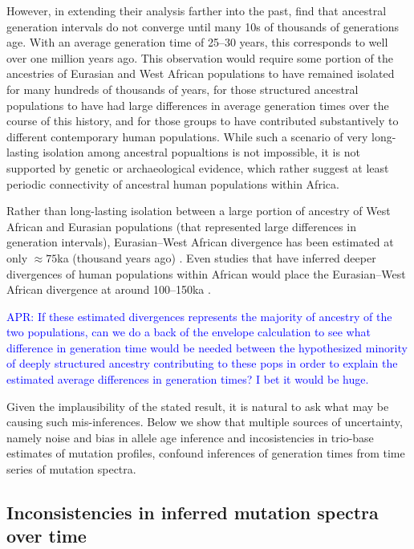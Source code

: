 \documentclass[]{article}
\newcommand{\aprcomment}[1]{{\textcolor{blue}{APR: #1}}}
\begin{document}
However, in extending their analysis farther into the past,
\citeauthor{wang2023human} find that ancestral generation intervals do not
converge until many 10s of thousands of generations age. With an average
generation time of 25--30 years, this corresponds to well over one million
years ago. This observation would require some portion of the ancestries of
Eurasian and West African populations to have remained isolated for many
hundreds of thousands of years, for those structured ancestral populations to
have had large differences in average generation times over the course of this
history, and for those groups to have contributed substantively to different
contemporary human populations. While such a scenario of very long-lasting
isolation among ancestral popualtions is not impossible, it is not supported by
genetic \citep{ragsdale2022weakly,others} or archaeological
\citep{scerri2018did,others} evidence, which rather suggest at least periodic
connectivity of ancestral human populations within Africa.

Rather than long-lasting isolation between a large portion of ancestry of West
African and Eurasian populations (that represented large differences in
generation intervals), Eurasian--West African divergence has been estimated at
only $\approx 75$ka (thousand years ago)
\citep[e.g.,][]{pagani2015tracing,other}. Even studies that have inferred
deeper divergences of human populations within African would place the
Eurasian--West African divergence at around 100--150ka
\citep{schlebusch2017southern}. 

\aprcomment{
    If these estimated divergences represents the majority of ancestry of the
    two populations, can we do a back of the envelope calculation to see what
    difference in generation time would be needed between the hypothesized
    minority of deeply structured ancestry contributing to these pops in order
    to explain the estimated average differences in generation times? I bet it
    would be huge.
}

Given the implausibility of the stated result, it is natural to ask what may be
causing such mis-inferences. Below we show that multiple sources of uncertainty,
namely noise and bias in allele age inference and incosistencies in trio-base
estimates of mutation profiles, confound inferences of generation times from
time series of mutation spectra.

\subsection*{Inconsistencies in inferred mutation spectra over time}
\end{document}
